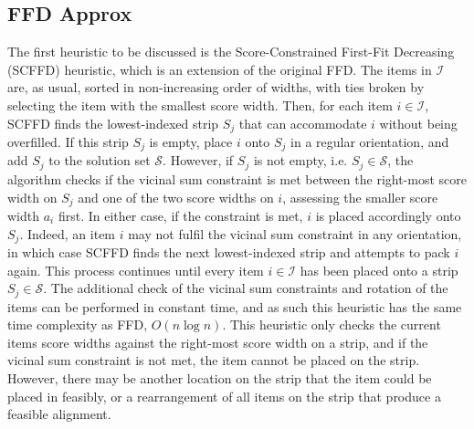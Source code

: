 \documentclass[oribibl]{llncs}
\begin{document}
\subsection{FFD Approx}
\label{sec:ffdapprox}
The first heuristic to be discussed is the Score-Constrained First-Fit Decreasing (SCFFD) heuristic, which is an extension of the original FFD. The items in $\mathcal{I}$ are, as usual, sorted in non-increasing order of widths, with ties broken by selecting the item with the smallest score width. Then, for each item $i \in \mathcal{I}$, SCFFD finds the lowest-indexed strip $S_j$ that can accommodate $i$ without being overfilled. If this strip $S_j$ is empty, place $i$ onto $S_j$ in a regular orientation, and add $S_j$ to the solution set $\mathcal{S}$. However, if $S_j$ is not empty, i.e. $S_j \in \mathcal{S}$, the algorithm checks if the vicinal sum constraint is met between the right-most score width on $S_j$ and one of the two score widths on $i$, assessing the smaller score width $a_i$ first. In either case, if the constraint is met, $i$ is placed accordingly onto $S_j$. Indeed, an item $i$ may not fulfil the vicinal sum constraint in any orientation, in which case SCFFD finds the next lowest-indexed strip and attempts to pack $i$ again. This process continues until every item $i \in \mathcal{I}$ has been placed onto a strip $S_j \in \mathcal{S}$. The additional check of the vicinal sum constraints and rotation of the items can be performed in constant time, and as such this heuristic has the same time complexity as FFD, $O(n \log n)$. This heuristic only checks the current items score widths against the right-most score width on a strip, and if the vicinal sum constraint is not met, the item cannot be placed on the strip. However, there may be another location on the strip that the item could be placed in feasibly, or a rearrangement of all items on the strip that produce a feasible alignment.
\end{document}
